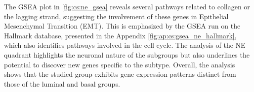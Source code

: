 The GSEA plot in \cref{fig:cs:ne_gsea} reveals several pathways related to collagen or the lagging strand, suggesting the involvement of these genes in Epithelial Mesenchymal Transition (EMT). This is emphasized by the GSEA run on the Hallmark database, presented in the Appendix \cref{fig:ap:cs:gsea_ne_hallmark}, which also identifies pathways involved in the cell cycle. The analysis of the NE quadrant highlights the neuronal nature of the subgroups but also underlines the potential to discover new genes specific to the subtype. Overall, the analysis shows that the studied group exhibits gene expression patterns distinct from those of the luminal and basal groups.
